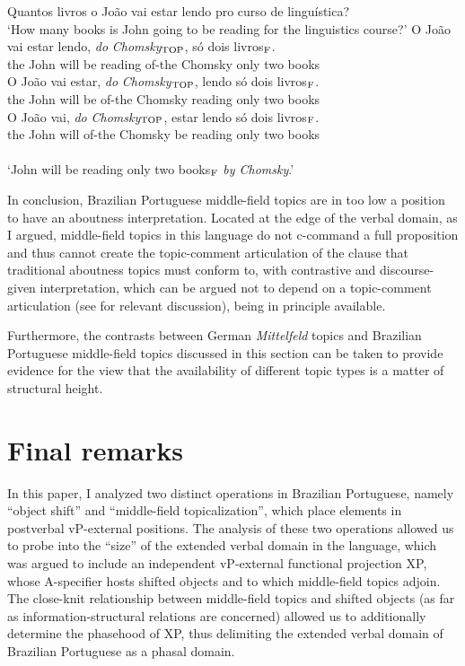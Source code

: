 \documentclass[output=paper]{langscibook}
\begin{document}
\begin{exe}
\ex \label{lacerda41}
\begin{xlist}
 \label{lacerda41A}
Quantos livros o João vai estar lendo pro curso de linguística?\\
‘How many books is John going to be reading for the linguistics course?’
 \label{lacerda41B1}
\gll O 	João 	vai 	estar 	lendo, 	\emph{do} 	\emph{Chomsky}$_{\textnormal{TOP}}$, 	só 	dois 	livros$_{\textnormal{F}}$.\\
the 	John 	will 	be 	reading 	of-the 	Chomsky 	only 	two 	books\\
 \label{lacerda41B2}
\gll *O 	João 	vai 	estar, 	\emph{do} 	\emph{Chomsky}$_{\textnormal{TOP}}$, 	lendo 	só 	dois 	livros$_{\textnormal{F}}$.\\
the 	John 	will 	be 	of-the 	Chomsky 	reading 	only 	two 	books\\
 \label{lacerda41B3}
\gll *O 	João 	vai, 	\emph{do} 	\emph{Chomsky}$_{\textnormal{TOP}}$, 	estar 	lendo 	só 	dois 	livros$_{\textnormal{F}}$.\\
the 	John 	will 	of-the 	Chomsky 	be 	reading 	only 	two 	books\\\\
‘John will be reading only two books$_{\textnormal{F}}$ \emph{by Chomsky}.’
\end{xlist}


\end{exe}

In conclusion, Brazilian Portuguese middle-field topics are in too low a position to have an aboutness interpretation. Located at the edge of the verbal domain, as I argued, middle-field topics in this language do not c-command a full proposition and thus cannot create the topic-comment articulation of the clause that traditional aboutness topics must conform to, with contrastive and discourse-given interpretation, which can be argued not to depend on a topic-comment articulation (see \citealt{Lacerda2020b} for relevant discussion), being in principle available.

Furthermore, the contrasts between German \emph{Mittelfeld} topics and Brazilian Portuguese middle-field topics discussed in this section can be taken to provide evidence for the view that the availability of different topic types is a matter of structural height.

\section{Final remarks}
In this paper, I analyzed two distinct operations in Brazilian Portuguese, namely “object shift” and “middle-field topicalization”, which place elements in postverbal vP-external positions. The analysis of these two operations allowed us to probe into the “size” of the extended verbal domain in the language, which was argued to include an independent vP-external functional projection XP, whose A-specifier hosts shifted objects and to which middle-field topics adjoin. The close-knit relationship between middle-field topics and shifted objects (as far as information-structural relations are concerned) allowed us to additionally determine the phasehood of XP, thus delimiting the extended verbal domain of Brazilian Portuguese as a phasal domain.
\end{document}
